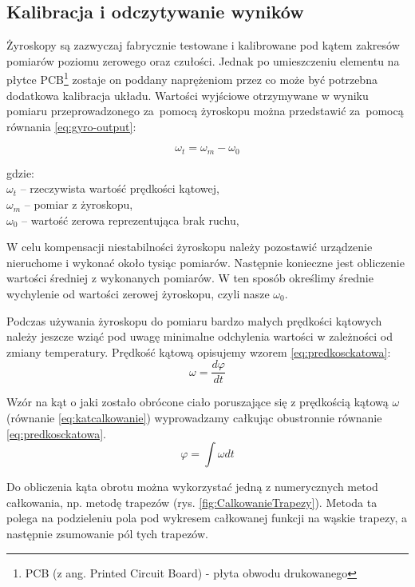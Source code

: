 \subsection{Kalibracja i odczytywanie wyników}
Żyroskopy są zazwyczaj fabrycznie testowane i kalibrowane pod kątem zakresów pomiarów poziomu zerowego oraz czułości. 
Jednak po umieszczeniu elementu na płytce PCB\footnote{PCB (z ang. Printed
Circuit Board) - płyta obwodu drukowanego} zostaje on poddany naprężeniom przez
co może być potrzebna dodatkowa kalibracja układu. Wartości wyjściowe
otrzymywane w wyniku pomiaru przeprowadzonego za~pomocą żyroskopu można
przedstawić za~pomocą równania \ref{eq:gyro-output}:

\begin{equation}
	\label{eq:gyro-output}
  \omega_{t} = \omega_{m} - \omega_{0}
\end{equation}
\begin{tabbing}
  gdzie: \= \\
    \> $\omega_{t}$ -- rzeczywista wartość prędkości kątowej, \\
    \> $\omega_{m}$ -- pomiar z żyroskopu,\\
    \> $\omega_{0}$ -- wartość zerowa reprezentująca brak ruchu,\\
\end{tabbing}

W celu kompensacji niestabilności żyroskopu należy pozostawić urządzenie
nieruchome i wykonać około tysiąc pomiarów. Następnie konieczne jest obliczenie
wartości średniej z wykonanych pomiarów. W ten sposób określimy średnie wychylenie od wartości zerowej żyroskopu, czyli nasze $\omega_{0}$.

Podczas używania żyroskopu do pomiaru bardzo małych prędkości kątowych należy
jeszcze wziąć pod uwagę minimalne odchylenia wartości w zależności od zmiany temperatury.
Prędkość kątową opisujemy wzorem \ref{eq:predkosckatowa}: 
\begin{equation}
  \label{eq:predkosckatowa}
  \omega = \frac{d\varphi}{dt}
\end{equation}

Wzór na kąt o jaki zostało obrócone ciało poruszające się z prędkością kątową
$\omega$ (równanie \ref{eq:katcalkowanie}) wyprowadzamy całkując obustronnie
równanie \ref{eq:predkosckatowa}.
\begin{equation}
  \label{eq:katcalkowanie}
  \varphi = \int \omega dt
\end{equation}

Do obliczenia kąta obrotu można wykorzystać jedną z numerycznych metod
całkowania, np. metodę trapezów (rys. \ref{fig:CalkowanieTrapezy}). Metoda ta
polega na podzieleniu pola pod wykresem całkowanej funkcji na wąskie trapezy, a następnie zsumowanie pól tych
trapezów.

